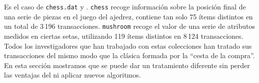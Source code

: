 Es el caso de \texttt{chess.dat} y \mushroom.  \texttt{chess} recoge información sobre la posición final de una serie de piezas en el juego del ajedrez, contiene tan solo 75 ítems distintos en un total de 3\,196 transacciones. \texttt{mushroom} recoge el valor de una serie de atributos medidos en ciertas setas, utilizando 119 ítems distintos en 8\,124 transacciones. Todos los investigadores que han trabajado con estas colecciones han tratado sus transacciones del mismo modo que la clásica \transaccion formada por la "`cesta de la compra"'. En esta sección mostramos que se puede dar un tratamiento diferente sin perder las ventajas del \ARM ni aplicar nuevos algoritmos.
